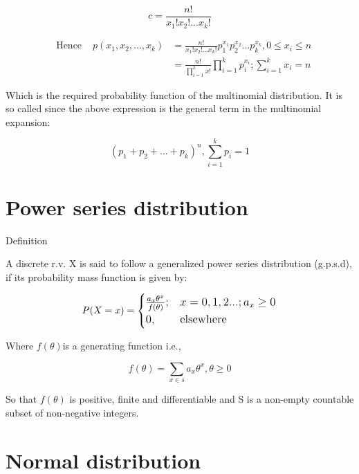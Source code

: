 \documentclass[ignorenonframetext,aspectratio=169]{beamer}
\begin{document}
\begin{frame}{}
\protect\hypertarget{section-1}{}

\[
c = \frac{n!}{x_1! x_2! ... x_k!}
\]

\[
\begin{aligned}
& \text{Hence } & p(x_1, x_2, ..., x_k) &= \frac{n!}{x_1! x_2! ... x_k!} p_1^{x_1} p_2^{x_2} ... p_k^{x_k}, 0 \leq x_i \leq n \\
& & &= \frac{n!}{\prod_{i = 1}^ k x!} \prod_{i = 1}^k p_i^{x_i}; \sum_{i = 1}^k x_i = n
\end{aligned}
\]

Which is the required probability function of the multinomial
distribution. It is so called since the above expression is the general
term in the multinomial expansion:

\[
(p_1 + p_2 + ... + p_k)^n, \sum_{i = 1}^k p_i = 1
\]

\end{frame}

\hypertarget{power-series-distribution}{%
\section{Power series distribution}\label{power-series-distribution}}

\begin{frame}{Definition}
\protect\hypertarget{definition-4}{}

A discrete r.v. X is said to follow a generalized power series
distribution (g.p.s.d), if its probability mass function is given by:

\[
\large
P(X = x) =
\begin{cases}
\frac{a_x \theta^x}{f(\theta)};  & x = 0, 1, 2...; a_x \geq 0 \\
0, & \text{elsewhere}
\end{cases}
\]

Where \(f(\theta)\)is a generating function i.e.,

\[
f(\theta) = \sum_{x \in s} a_x \theta^x, \theta \geq 0
\]

So that \(f(\theta)\) is positive, finite and differentiable and S is a
non-empty countable subset of non-negative integers.

\end{frame}

\hypertarget{normal-distribution}{%
\section{Normal distribution}\label{normal-distribution}}
\end{document}
